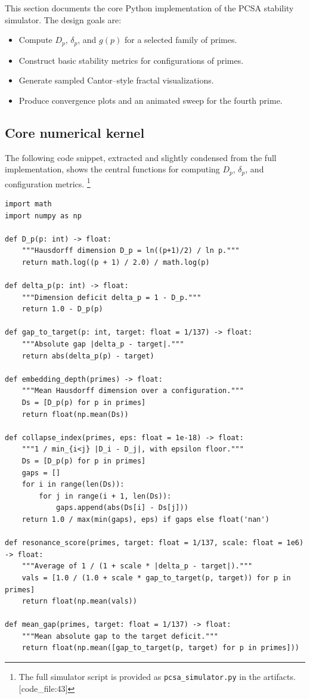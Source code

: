\documentclass[11pt]{article}
\begin{document}
This section documents the core Python implementation of the PCSA stability simulator. The design goals are:

\begin{itemize}
  \item Compute $D_p$, $\delta_p$, and $g(p)$ for a selected family of primes.
  \item Construct basic stability metrics for configurations of primes.
  \item Generate sampled Cantor--style fractal visualizations.
  \item Produce convergence plots and an animated sweep for the fourth prime.
\end{itemize}

\subsection{Core numerical kernel}

The following code snippet, extracted and slightly condensed from the full implementation, shows the central functions for computing $D_p$, $\delta_p$, and configuration metrics.%
\footnote{The full simulator script is provided as \texttt{pcsa\_simulator.py} in the artifacts. [code\_file:43]} 

\begin{verbatim}
import math
import numpy as np

def D_p(p: int) -> float:
    """Hausdorff dimension D_p = ln((p+1)/2) / ln p."""
    return math.log((p + 1) / 2.0) / math.log(p)

def delta_p(p: int) -> float:
    """Dimension deficit delta_p = 1 - D_p."""
    return 1.0 - D_p(p)

def gap_to_target(p: int, target: float = 1/137) -> float:
    """Absolute gap |delta_p - target|."""
    return abs(delta_p(p) - target)

def embedding_depth(primes) -> float:
    """Mean Hausdorff dimension over a configuration."""
    Ds = [D_p(p) for p in primes]
    return float(np.mean(Ds))

def collapse_index(primes, eps: float = 1e-18) -> float:
    """1 / min_{i<j} |D_i - D_j|, with epsilon floor."""
    Ds = [D_p(p) for p in primes]
    gaps = []
    for i in range(len(Ds)):
        for j in range(i + 1, len(Ds)):
            gaps.append(abs(Ds[i] - Ds[j]))
    return 1.0 / max(min(gaps), eps) if gaps else float('nan')

def resonance_score(primes, target: float = 1/137, scale: float = 1e6) -> float:
    """Average of 1 / (1 + scale * |delta_p - target|)."""
    vals = [1.0 / (1.0 + scale * gap_to_target(p, target)) for p in primes]
    return float(np.mean(vals))

def mean_gap(primes, target: float = 1/137) -> float:
    """Mean absolute gap to the target deficit."""
    return float(np.mean([gap_to_target(p, target) for p in primes]))
\end{verbatim}
\end{document}
